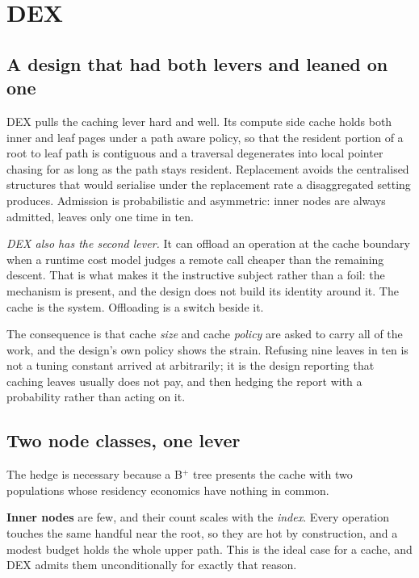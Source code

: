 \documentclass[sigconf,nonacm]{acmart}
\begin{document}
\section{DEX}
\label{sec:dex}

\subsection{A design that had both levers and leaned on one}

DEX pulls the caching lever hard and well. Its compute side cache holds both
inner and leaf pages under a path aware policy, so that the resident portion of a
root to leaf path is contiguous and a traversal degenerates into local pointer
chasing for as long as the path stays resident. Replacement avoids the
centralised structures that would serialise under the replacement rate a
disaggregated setting produces. Admission is probabilistic and asymmetric: inner
nodes are always admitted, leaves only one time in ten.

\emph{DEX also has the second lever.} It can offload an operation at the cache
boundary when a runtime cost model judges a remote call cheaper than the
remaining descent. That is what makes it the instructive subject rather than a
foil: the mechanism is present, and the design does not build its identity around
it. The cache is the system. Offloading is a switch beside it.

The consequence is that cache \emph{size} and cache \emph{policy} are asked to
carry all of the work, and the design's own policy shows the strain. Refusing
nine leaves in ten is not a tuning constant arrived at arbitrarily; it is the
design reporting that caching leaves usually does not pay, and then hedging the
report with a probability rather than acting on it.

\subsection{Two node classes, one lever}
\label{sec:dex:classes}

The hedge is necessary because a B$^+$ tree presents the cache with two
populations whose residency economics have nothing in common.

\textbf{Inner nodes} are few, and their count scales with the \emph{index}. Every
operation touches the same handful near the root, so they are hot by
construction, and a modest budget holds the whole upper path. This is the ideal
case for a cache, and DEX admits them unconditionally for exactly that reason.
\end{document}
